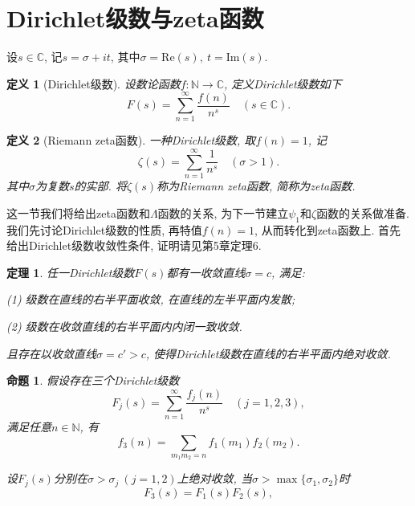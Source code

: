\documentclass[12pt, a4paper, oneside]{ctexart}
\newtheorem{theorem}{定理}[section] %
\newtheorem{definition}{定义}[section]
\newtheorem{proposition}{命题}[section]
\numberwithin{equation}{section}  %
\def\N{\mathbb{N}}          %
\def\C{\mathbb{C}}          %
\def\re{\mathrm{Re}}        %
\def\im{\mathrm{Im}}        %
\begin{document}
\section{Dirichlet级数与zeta函数}
设$s\in\C$, 记$s = \sigma + it$, 其中$\sigma = \re(s),\ t = \im(s)$.
\begin{definition}[Dirichlet级数]设数论函数$f:\N\to\C$, 定义Dirichlet级数如下
    \begin{equation*}
        F(s) = \sum_{n=1}^\infty\frac{f(n)}{n^s} \quad(s\in \C).
    \end{equation*}
\end{definition}
\begin{definition}[Riemann zeta函数]一种Dirichlet级数, 取$f(n) = 1$, 记
    \begin{equation*}
        \zeta(s) = \sum_{n=1}^\infty\frac{1}{n^s}\quad(\sigma > 1).
    \end{equation*}
    其中$\sigma$为复数$s$的实部. 将$\zeta(s)$称为Riemann zeta函数, 简称为zeta函数.
\end{definition}
这一节我们将给出zeta函数和$\Lambda$函数的关系, 为下一节建立$\psi_1$和$\zeta$函数的关系做准备. 我们先讨论Dirichlet级数的性质, 再特值$f(n)=1$, 从而转化到zeta函数上. 首先给出Dirichlet级数收敛性条件, 证明请见\cite{ref-复变函数}第5章定理6.
\begin{theorem}\label{thm-dirichlet}
    任一Dirichlet级数$F(s)$都有一收敛直线$\sigma = c$, 满足:
    
    (1) 级数在直线的右半平面收敛, 在直线的左半平面内发散;

    (2) 级数在收敛直线的右半平面内内闭一致收敛.

    且存在以收敛直线$\sigma = c' > c$, 使得Dirichlet级数在直线的右半平面内绝对收敛.
\end{theorem}
\begin{proposition}
    假设存在三个Dirichlet级数
    \begin{equation*}
        F_j(s) = \sum_{n=1}^\infty\frac{f_j(n)}{n^s}\quad(j=1,2,3),
    \end{equation*}
    满足任意$n\in \N$, 有
    \begin{equation*}
        f_3(n) = \sum_{m_1m_2= n}f_1(m_1)f_2(m_2).
    \end{equation*}

    设$F_j(s)$分别在$\sigma > \sigma_j\ (j=1,2)$上绝对收敛, 当$\sigma > \max\{\sigma_1, \sigma_2\}$时
    \begin{equation*}
        F_3(s) = F_1(s)F_2(s),
    \end{equation*}
\end{proposition}
\end{document}
